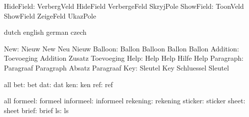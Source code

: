          HideField:  VerbergVeld       HideField            VerbergeFeld
                     SkryjPole
         ShowField:  ToonVeld          ShowField            ZeigeFeld
                     UkazPole

\stopvariables


\startvariables      dutch             english              german
                     czech

               New:  Nieuw             New                  Neu
                     Nieuw %
           Balloon:  Ballon            Balloon              Ballon
                     Ballon %
          Addition:  Toevoeging        Addition             Zusatz
                     Toevoeging %
              Help:  Help              Help                 Hilfe
                     Help %
         Paragraph:  Paragraaf         Paragraph            Absatz
                     Paragraaf %
               Key:  Sleutel           Key                  Schluessel
                     Sleutel %

\stopvariables




\startconstants       all
                bet:  bet
                dat:  dat
                ken:  ken
                ref:  ref
\stopconstants

\startvariables       all
            formeel:  formeel
          informeel:  informeel
           rekening:  rekening
            sticker:  sticker
              sheet:  sheet
              brief:  brief
                 ls:  ls
\stopvariables


\stoplogginginterface

\endinput
